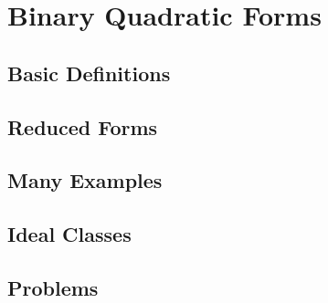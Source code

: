 \documentclass[../notes.tex]{subfiles}
\begin{document}
\section{Binary Quadratic Forms}

\subsection{Basic Definitions}

\subsection{Reduced Forms}

\subsection{Many Examples} \label{subsec:compute-primes-of-form}

\subsection{Ideal Classes}

\subsection{Problems}

\end{document}
